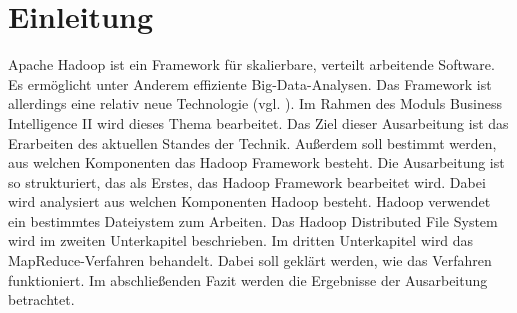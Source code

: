 \section{Einleitung}
Apache Hadoop ist ein Framework für skalierbare, verteilt arbeitende Software. Es ermöglicht unter Anderem effiziente Big-Data-Analysen. Das Framework ist allerdings eine relativ neue Technologie (vgl. \cite{avn}). Im Rahmen des Moduls \glqq Business Intelligence II\grqq{} wird dieses Thema bearbeitet. Das Ziel dieser Ausarbeitung ist das Erarbeiten des aktuellen Standes der Technik. Außerdem soll bestimmt werden, aus welchen Komponenten das Hadoop Framework besteht. Die Ausarbeitung ist so strukturiert, das als Erstes, das Hadoop Framework bearbeitet wird. Dabei wird analysiert aus welchen Komponenten Hadoop besteht. Hadoop verwendet ein bestimmtes Dateiystem zum Arbeiten. Das Hadoop Distributed File System wird im zweiten Unterkapitel beschrieben. Im dritten Unterkapitel wird das MapReduce-Verfahren behandelt. Dabei soll geklärt werden, wie das Verfahren funktioniert. Im abschließenden Fazit werden die Ergebnisse der Ausarbeitung betrachtet.